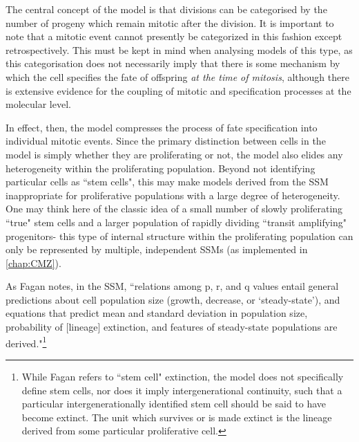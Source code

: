 The central concept of the model is that divisions can be categorised by the number of progeny which remain mitotic after the division. It is important to note that a mitotic event cannot presently be categorized in this fashion except retrospectively. This must be kept in mind when analysing models of this type, as this categorisation does not necessarily imply that there is some mechanism by which the cell specifies the fate of offspring \textit{at the time of mitosis}, although there is extensive evidence for the coupling of mitotic and specification processes at the molecular level.

In effect, then, the model compresses the process of fate specification into individual mitotic events. Since the primary distinction between cells in the model is simply whether they are proliferating or not, the model also elides any heterogeneity within the proliferating population. Beyond not identifying particular cells as ``stem cells", this may make models derived from the SSM inappropriate for proliferative populations with a large degree of heterogeneity. One may think here of the classic idea of a small number of slowly proliferating ``true" stem cells and a larger population of rapidly dividing ``transit amplifying" progenitors- this type of internal structure within the proliferating population can only be represented by multiple, independent SSMs (as implemented in \autoref{chap:CMZ}).

As Fagan notes, in the SSM, ``relations among p, r, and q values entail general predictions about cell population size (growth, decrease, or ‘steady-state’), and equations that predict mean and standard deviation in population size, probability of [lineage] extinction, and features of steady-state populations are derived."\footnote{While Fagan refers to ``stem cell" extinction, the model does not specifically define stem cells, nor does it imply intergenerational continuity, such that a particular intergenerationally identified stem cell should be said to have become extinct. The unit which survives or is made extinct is the lineage derived from some particular proliferative cell.} \cite[p.60]{Fagan2013}

